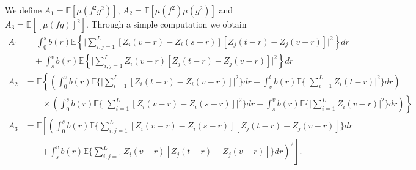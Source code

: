 \documentclass[11pt]{article}
\def\E{{\mathbb E}}
\def\z {\mathbf{z}}
\begin{document}
We define $A_1=\E[\mu(f^2g^2)]$, $A_2=\E[\mu(f^2)\mu(g^2)]$ and $A_3=\E[[\mu(fg)]^2]$. Through a simple computation we obtain
\begin{align}
A_1&=\int_0^s \bar{b}(r)\E\left\{\Big|\sum_{i,j=1}^L[Z_i(v-r)-Z_i(s-r)][Z_j(t-r)-Z_j(v-r)]\Big|^2 \right\}dr\nonumber\\
&\quad+\int_s^v\bar{b}(r)\E\left\{\Big|\sum_{i,j=1}^L Z_i(v-r)[Z_j(t-r)-Z_j(v-r)]\Big|^2\right\}dr\label{1}\\
A_2&=\E\left\{\left(\int_0^v{b}(r)\E\Big\{\Big|\sum_{i=1}^L [Z_i(t-r)-Z_i(v-r)]\Big|^2\Big\}dr+\int_v^t{b}(r)\E\Big\{\Big|\sum_{i=1}^L Z_i(t-r)\Big|^2\Big\}dr\right)\right.\nonumber\\
&\quad\quad \times\left.\left(\int_0^s{b}(r) \E\Big\{\Big|\sum_{i=1}^L [Z_i(v-r)-Z_i(s-r)]\Big|^2\Big\}dr+\int_s^v{b}(r)\E\Big\{\Big|\sum_{i=1}^L Z_i(v-r)\Big|^2\Big\}dr\right)\right\}\label{2}\\
A_3&= \E\left[\left(\int_0^sb(r)\E\Big\{\sum_{i,j=1}^L[Z_i(v-r)-Z_i(s-r)][Z_j(t-r)-Z_j(v-r)]\Big\}dr\right.\right.\nonumber\\
&\quad\quad\left.\left. +\int_s^vb(r)\E\Big\{\sum_{i,j=1}^L Z_i(v-r)[Z_j(t-r)-Z_j(v-r)]\Big\}dr\right)^2\right]\label{4}.
\end{align}
\end{document}
